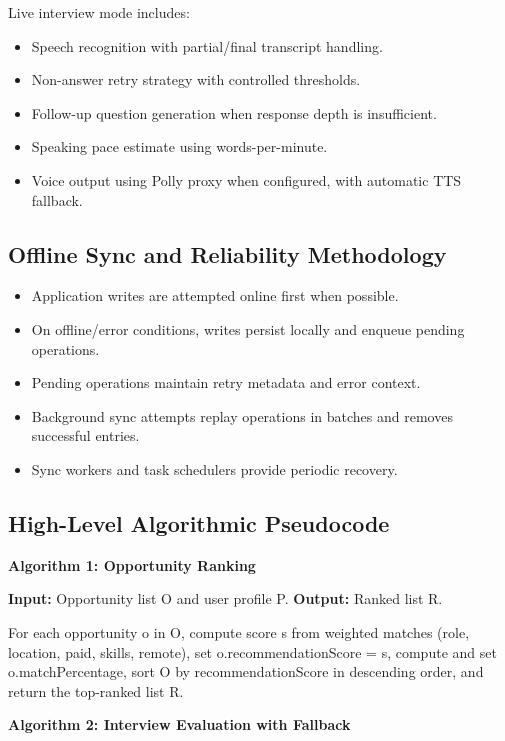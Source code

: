 \documentclass[conference]{IEEEtran}
\begin{document}
Live interview mode includes:

\begin{itemize}
  \item Speech recognition with partial/final transcript handling.
  \item Non-answer retry strategy with controlled thresholds.
  \item Follow-up question generation when response depth is insufficient.
  \item Speaking pace estimate using words-per-minute.
  \item Voice output using Polly proxy when configured, with automatic TTS fallback.
\end{itemize}

\subsection{Offline Sync and Reliability Methodology}

\begin{itemize}
  \item Application writes are attempted online first when possible.
  \item On offline/error conditions, writes persist locally and enqueue pending operations.
  \item Pending operations maintain retry metadata and error context.
  \item Background sync attempts replay operations in batches and removes successful entries.
  \item Sync workers and task schedulers provide periodic recovery.
\end{itemize}

\subsection{High-Level Algorithmic Pseudocode}

\textbf{Algorithm 1: Opportunity Ranking}

\textbf{Input:} Opportunity list O and user profile P. \textbf{Output:} Ranked list R.

For each opportunity o in O, compute score s from weighted matches (role, location, paid, skills, remote), set o.recommendationScore = s, compute and set o.matchPercentage, sort O by recommendationScore in descending order, and return the top-ranked list R.

\textbf{Algorithm 2: Interview Evaluation with Fallback}
\end{document}
